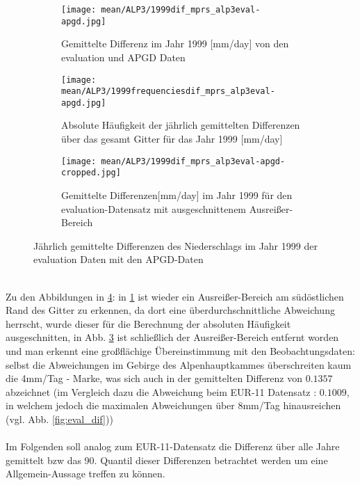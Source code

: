 \begin{figure}[hbt!]
	\begin{subfigure}{0.49\textwidth}
		\texttt{[image: mean/ALP3/1999dif\_mprs\_alp3eval-apgd.jpg]}
		\caption{Gemittelte Differenz im Jahr 1999 [mm/day] von den evaluation und APGD Daten}
		\label{fig:dif_eval_apgd_1999}
	\end{subfigure}
	\begin{subfigure}{0.49\textwidth}
		\texttt{[image: mean/ALP3/1999frequenciesdif\_mprs\_alp3eval-apgd.jpg]}
		\caption{Absolute Häufigkeit der jährlich gemittelten Differenzen über das gesamt Gitter für das Jahr 1999 [mm/day]}
		\label{fig:freq_dif_eval_apgd_1999}
	\end{subfigure}
	\begin{subfigure}{\textwidth}
		\texttt{[image: mean/ALP3/1999dif\_mprs\_alp3eval-apgd-cropped.jpg]}
		\caption{Gemittelte Differenzen[mm/day] im Jahr 1999 für den evaluation-Datensatz mit ausgeschnittenem Ausreißer-Bereich}
		\label{fig:cropped_dif_eval_apgd_1999}
	\end{subfigure}
	\caption{Jährlich gemittelte Differenzen des Niederschlags im Jahr 1999 der evaluation Daten mit den APGD-Daten}
	\label{fig:eval_apgd}
\end{figure}
\\
Zu den Abbildungen in \ref{fig:eval_apgd}: in \ref{fig:dif_eval_apgd_1999} ist wieder ein Ausreißer-Bereich am südöstlichen Rand des Gitter zu erkennen, da dort eine überdurchschnittliche Abweichung herrscht, wurde dieser für die Berechnung der absoluten Häufigkeit ausgeschnitten, in Abb. \ref{fig:cropped_dif_eval_apgd_1999} ist schließlich der Ausreißer-Bereich entfernt worden und man erkennt eine großflächige Übereinstimmung mit den Beobachtungsdaten: selbst die Abweichungen im Gebirge des Alpenhauptkammes überschreiten kaum die 4mm/Tag - Marke, was sich auch in der gemittelten Differenz von $0.1357$ abzeichnet (im Vergleich dazu die Abweichung beim EUR-11 Datensatz : $0.1009$, in welchem jedoch die maximalen Abweichungen über 8mm/Tag hinausreichen (vgl. Abb. \ref{fig:eval_dif}))\\
\\
Im Folgenden soll analog zum EUR-11-Datensatz die Differenz über alle Jahre gemittelt bzw das 90. Quantil dieser Differenzen betrachtet werden um eine Allgemein-Aussage treffen zu können.\\
